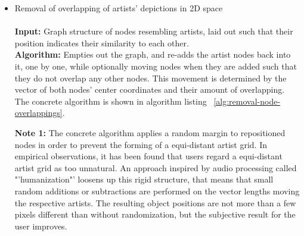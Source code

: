 \begin{itemize}
\begin{itemize}
			\item Application of spring model forces on all nodes for a few iterations \\\\
				\textbf{Input:} Graph structure of nodes resembling artists, many of them suboptimally positioned \\
				\textbf{Algorithm:} Applies the aforementioned multi-dimensional scaling algorithm on the whole graph of
				all artist nodes, thus reducing system stress \footnote{System stress is a metric for how well the current layout of a graph satisfies its internal forces. The higher the disconnect between the node's optimal distances and their actual distances is, the higher is the stress. One way to calculate stress is: S = $\sum_{n_i, n_j}^{n_N} ( Actual Distance(n_i, n_j) - Optimal Distance(n_i, n_j) ) ^ 2, n_i != n_j$} (finding a better position for each artist).  \\
				\textbf{Output:} Graph structure of nodes resembling artists, laid out such that their position 
				indicates their similarity to each other.\\
				
			\end{itemize}
				
	\item Removal of overlapping of artists' depictions in 2D space	\\\\
				\textbf{Input:} Graph structure of nodes resembling artists, laid out such that their position 
				indicates their similarity to each other. \\
				\textbf{Algorithm:} Empties out the graph, and re-adds the artist nodes back into it, one by one,	while optionally moving nodes when they are added such that they do not overlap any other nodes. This	movement is determined by the vector of both nodes' center coordinates and their amount	of overlapping. The concrete algorithm is shown in algorithm listing ~\ref{alg:removal-node-overlappings}. 

				\textbf{Note 1:} The concrete algorithm applies a random margin to repositioned nodes in order to prevent the forming of a equi-distant artist grid. In empirical observations, it has been found that users regard a equi-distant artist grid as too unnatural. An approach inspired by audio processing called "'humanization"' loosens up this rigid structure, that means that small random additions or subtractions are performed on the vector lengths moving the respective artists. The resulting object positions are not more than a few pixels different than without randomization, but the subjective result for the user improves.


\end{itemize}
